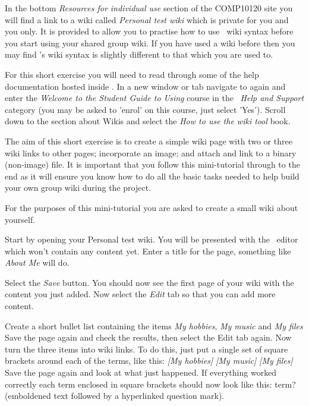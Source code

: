 In the bottom \emph{Resources for individual use} section of the COMP10120 site you will find a link to a wiki called \emph{Personal test wiki} which is private for you and you only. It is provided to allow you to practise how to use \moodle\ wiki syntax before you start using your shared group wiki. If you have used a wiki before then you may find \Moodle's wiki syntax is slightly different to that which you are used to.

For this short exercise you will need to read through some of the help documentation hosted inside \moodle. In a new window or tab navigate to  again and enter the \emph{ \emph{Welcome to the Student Guide to Using \Moodle} }course in the \moodle\ \emph{Help and Support}  category (you may be asked to 'enrol' on this course, just select 'Yes'). Scroll down to the section about Wikis and select the \emph{How to use the wiki tool} book.

The aim of this short exercise is to create a simple wiki page with two or three wiki links to other pages; incorporate an image; and attach and link to a binary (non-image) file. It is important that you follow this mini-tutorial through to the end as it will ensure you know how to do all the basic tasks needed to help build your own group wiki during the project.

For the purposes of this mini-tutorial you are asked to create a small wiki about yourself.

Start by opening your Personal test wiki. You will be presented with the \moodle\ editor which won't contain any content yet. Enter a title for the page, something like \emph{About Me} will do.

Select the \emph{Save} button. You should now see the first page of your wiki with the content you just added. Now select the \emph{Edit} tab so that you can add more content.

Create a short bullet list containing the items \emph{My hobbies},  \emph{My music}  and \emph{My files}  Save the page again and check the results, then select the Edit tab again. Now turn the three items into wiki links. To do this, just put a single set of square brackets around each of the terms, like this: \emph{[My hobbies]}  \emph{[My music]}  \emph{[My files]}  Save the page again and look at what just happened. If everything worked correctly each term enclosed in square brackets should now look like this: term? (emboldened text followed by a hyperlinked question mark).

